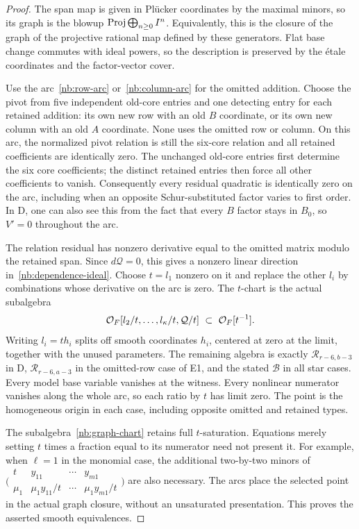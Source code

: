 \begin{proof}
The span map is given in Pl\"ucker coordinates by the maximal minors,
so its graph is the blowup $\operatorname{Proj}\bigoplus_{n\geq0}I^n$.
Equivalently, this is the closure of the graph of the projective
rational map defined by these generators. Flat base change commutes
with ideal powers, so the description is preserved by the \'etale
coordinates and the factor-vector cover.

Use the arc~\eqref{nb:row-arc} or~\eqref{nb:column-arc} for the
omitted addition. Choose the pivot from five independent old-core
entries and one detecting entry for each retained addition: its own
new row with an old $B$ coordinate, or its own new column with an
old $A$ coordinate. None uses the omitted row or column. On this arc,
the normalized pivot relation is still the six-core relation and
all retained coefficients are identically zero. The unchanged old-core
entries first determine the six core coefficients; the distinct
retained entries then force all other coefficients to vanish.
Consequently every residual quadratic is identically zero on the
arc, including when an opposite Schur-substituted factor varies to
first order. In D, one can also see this from the fact that every
$B$ factor stays in $B_0$, so $V'=0$ throughout the arc.

The relation residual has nonzero derivative equal to the omitted
matrix modulo the retained span. Since $d\mathcal Q=0$, this gives
a nonzero linear direction in~\eqref{nb:dependence-ideal}. Choose
$t=l_1$ nonzero on it and replace the other $l_i$ by combinations
whose derivative on the arc is zero. The $t$-chart is the actual
subalgebra
\begin{equation}\label{nb:graph-chart}
 \mathcal O_F[l_2/t,\ldots,l_\kappa/t,\mathcal Q/t]
 \ \subset\ \mathcal O_F[t^{-1}].
\end{equation}
Writing $l_i=th_i$ splits off smooth coordinates $h_i$, centered at
zero at the limit, together with the unused parameters. The remaining
algebra is exactly $\mathcal R_{r-6,b-3}$ in D,
$\mathcal R_{r-6,a-3}$ in the omitted-row case of E1, and the stated
$\mathcal B$ in all star cases. Every model base variable vanishes
at the witness. Every nonlinear numerator vanishes along the whole
arc, so each ratio by $t$ has limit zero. The point is the homogeneous
origin in each case, including opposite omitted and retained types.

The subalgebra~\eqref{nb:graph-chart} retains full $t$-saturation.
Equations merely setting $t$ times a fraction equal to its numerator
need not present it. For example, when $\ell=1$ in the monomial
case, the additional two-by-two minors of
$\bigl(\begin{smallmatrix}t&y_{11}&\cdots&y_{m1}\\
\mu_1&\mu_1y_{11}/t&\cdots&\mu_1y_{m1}/t\end{smallmatrix}\bigr)$
are also necessary. The arcs place the selected point in the actual
graph closure, without an unsaturated presentation. This proves the
asserted smooth equivalences.
\end{proof}

